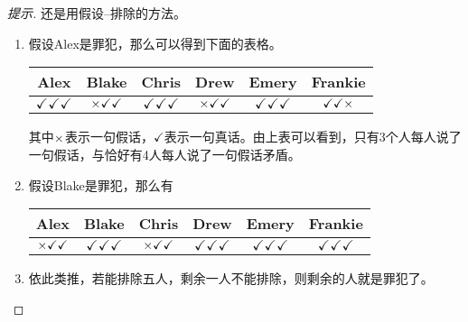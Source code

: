 \begin{proof}[提示]
  还是用假设--排除的方法。
  \begin{enumerate}
  \item 假设Alex是罪犯，那么可以得到下面的表格。
    \begin{center}
    \begin{tabular}{cccccc}
      \toprule
      Alex & Blake & Chris & Drew & Emery & Frankie\\\midrule
      $\checkmark\checkmark\checkmark$ & $\times\checkmark\checkmark$ & $\checkmark\checkmark\checkmark$ & $\times\checkmark\checkmark$ & $\checkmark\checkmark\checkmark$ & $\checkmark\checkmark\times$\\                                         
      \bottomrule
    \end{tabular}
    \end{center}
    其中$\times$表示一句假话，$\checkmark$表示一句真话。由上表可以看到，只有3个人每人说了一句假话，与恰好有4人每人说了一句假话矛盾。
    
  \item 假设Blake是罪犯，那么有
    \begin{center}
      \begin{tabular}{cccccc}
        \toprule
        Alex & Blake & Chris & Drew & Emery & Frankie\\\midrule
        $\times\checkmark\checkmark$ & $\checkmark\checkmark\checkmark$ & $\times\checkmark\checkmark$ & $\checkmark\checkmark\checkmark$ & $\checkmark\checkmark\checkmark$ & $\checkmark\checkmark\checkmark$\\
        \bottomrule
      \end{tabular}
    \end{center}
  \item 依此类推，若能排除五人，剩余一人不能排除，则剩余的人就是罪犯了。\hfill $\qedhere$
  \end{enumerate}
\end{proof}

